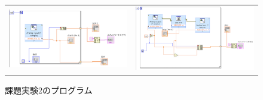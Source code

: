 \documentclass[11pt,dvipdfmx]{jarticle}
\begin{document}
			\begin{figure}[h]
				\begin{tabular}{cc}
					\begin{minipage}[c]{0.5\linewidth}
						\centering
						\includegraphics[keepaspectratio,scale=0.45]{circuit1.png}
						\caption{課題実験１のプログラム}
						\label{fig:program1}
		
					\end{minipage}&
		
					\begin{minipage}[c]{0.5\linewidth}
						\centering
						\includegraphics[keepaspectratio,scale=0.4]{circuit2.png}
						\caption{課題実験2のプログラム}
						\label{fig:program2}
						
					\end{minipage}\\


\end{tabular}
\end{figure}
\end{document}
